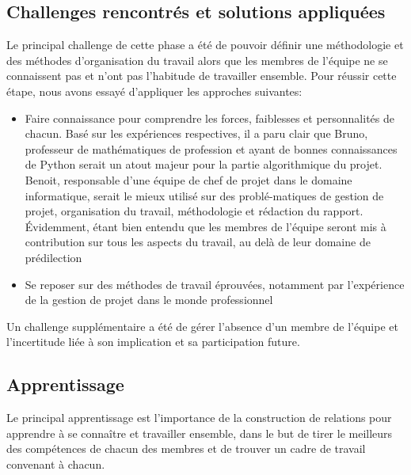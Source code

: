 \subsection{Challenges rencontrés et solutions appliquées}

Le principal challenge de cette phase a été de pouvoir définir une méthodologie et des méthodes d'organisation du travail alors que 
les membres de l'équipe ne se connaissent pas et n’ont pas l’habitude de travailler ensemble.
Pour réussir cette étape, nous avons essayé d’appliquer les approches suivantes:
\begin{itemize}
    \item Faire connaissance pour comprendre les forces, faiblesses et personnalités de chacun. Basé sur les expériences respectives, 
    il a paru clair que Bruno, professeur de mathématiques de profession et ayant de bonnes connaissances 
    de Python serait un atout majeur pour la partie algorithmique du projet. Benoit, responsable d’une équipe de chef de projet 
    dans le domaine informatique, serait le mieux utilisé sur des problé-matiques de gestion de projet, organisation du travail, 
    méthodologie et rédaction du rapport. Évidemment, étant bien entendu que les membres de l'équipe seront mis à contribution 
    sur tous les aspects du travail, au delà de leur domaine de prédilection
    \item Se reposer sur des méthodes de travail éprouvées, notamment par l'expérience de la gestion de projet dans le monde professionnel 
\end{itemize}

Un challenge supplémentaire a été de gérer l’absence d’un membre de l'équipe et l’incertitude liée à son implication et sa participation future.

\subsection{Apprentissage}

Le principal apprentissage est l'importance de la construction de relations pour apprendre à se connaître et travailler ensemble, 
dans le but de tirer le meilleurs des compétences de chacun des membres et de trouver un cadre de travail convenant à chacun.
